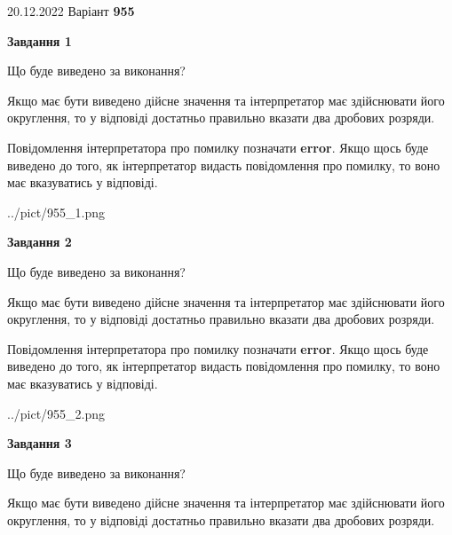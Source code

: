 \documentclass[12pt, ukrainian]{article}
\begin{document}
{20.12.2022 Варіант \No \textbf { 955 }\par}
{
\begin {Large}

{\begin {center}\textbf{Завдання 1}\end {center}}\par
Що буде виведено за виконання? \par

Якщо має бути виведено дійсне значення та інтерпретатор має здійснювати його округлення, 
то у відповіді достатньо правильно вказати два дробових розряди.

Повідомлення інтерпретатора про помилку позначати \textbf{error}.
Якщо щось буде виведено до того, як інтерпретатор видасть повідомлення про помилку, 
то воно має вказуватись у відповіді. \par

\begin{center}
	{../pict/955_1.png}
\end{center}
\newpage

{\begin {center}\textbf{Завдання 2}\end {center}}\par
Що буде виведено за виконання? \par

Якщо має бути виведено дійсне значення та інтерпретатор має здійснювати його округлення, 
то у відповіді достатньо правильно вказати два дробових розряди.

Повідомлення інтерпретатора про помилку позначати \textbf{error}.
Якщо щось буде виведено до того, як інтерпретатор видасть повідомлення про помилку, 
то воно має вказуватись у відповіді. \par

\begin{center}
	{../pict/955_2.png}
\end{center}
\newpage

{\begin {center}\textbf{Завдання 3}\end {center}}\par
Що буде виведено за виконання? \par

Якщо має бути виведено дійсне значення та інтерпретатор має здійснювати його округлення, 
то у відповіді достатньо правильно вказати два дробових розряди.


\end{Large}}
\end{document}
